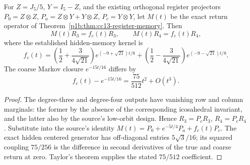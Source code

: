 \documentclass[11pt]{article}
\begin{document}
\begin{corollary}
\label{p1b:cor:cc18-angular-memory}
For $Z=J_5/5$, $Y=I_5-Z$, and the existing orthogonal register
projectors $P_0=Z\otimes Z$, $P_a=Z\otimes Y+Y\otimes Z$,
$P_c=Y\otimes Y$, let $M(t)$ be the exact return
operator of Theorem~\ref{p1b:thm:cc13-register-memory}.  Then
\[
\boxed{M(t)R_3=f_c(t)R_3,\qquad M(t)R_4=f_c(t)R_4,}
\]
where the established hidden-memory kernel is
\[
f_c(t)=\left(\frac12+\frac{3}{4\sqrt{21}}\right)
 e^{(-9+\sqrt{21})t/8}
+\left(\frac12-\frac{3}{4\sqrt{21}}\right)
 e^{(-9-\sqrt{21})t/8}.
\]
The coarse Markov closure $e^{-15t/16}$ differs by
\[
\boxed{f_c(t)-e^{-15t/16}=\frac{75}{512}t^2+O(t^3).}
\]
\end{corollary}
\begin{proof}
The degree-three and degree-four outputs have vanishing row and
column marginals: the former by the absence of the corresponding
icosahedral invariant, and the latter also by the source's low-orbit
design.  Hence $R_3=P_cR_3$, $R_4=P_cR_4$.
Substitute into the source's identity
$M(t)=P_0+e^{-5t/4}P_a+f_c(t)P_c$.
The exact hidden centered generator has off-diagonal entries
$5\sqrt3/16$; its squared coupling $75/256$ is the difference in
second derivatives of the true and coarse return at zero.  Taylor's
theorem supplies the stated $75/512$ coefficient.
\end{proof}
\end{document}
